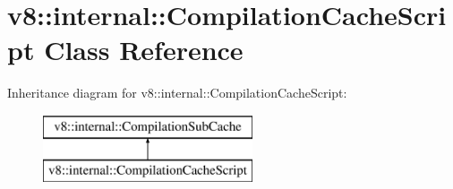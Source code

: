 \hypertarget{classv8_1_1internal_1_1_compilation_cache_script}{}\section{v8\+:\+:internal\+:\+:Compilation\+Cache\+Script Class Reference}
\label{classv8_1_1internal_1_1_compilation_cache_script}
Inheritance diagram for v8\+:\+:internal\+:\+:Compilation\+Cache\+Script\+:\begin{figure}[H]
\begin{center}
\leavevmode
\includegraphics[height=2.000000cm]{classv8_1_1internal_1_1_compilation_cache_script}
\end{center}
\end{figure}
